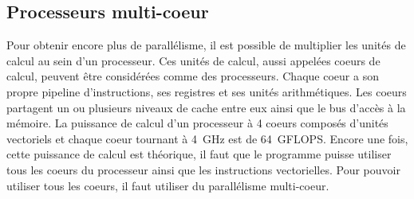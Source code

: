 \subsection{Processeurs multi-coeur}
Pour obtenir encore plus de parallélisme, il est possible de multiplier les unités de calcul au sein d'un processeur.
%
Ces unités de calcul, aussi appelées coeurs de calcul, peuvent être considérées comme des processeurs.
%
Chaque coeur a son propre pipeline d'instructions, ses registres et ses unités arithmétiques.
%
Les coeurs partagent un ou plusieurs niveaux de cache entre eux ainsi que le bus d'accès à la mémoire.
%
La puissance de calcul d'un processeur à 4 coeurs composés d'unités vectoriels et chaque coeur tournant à 4~GHz est de 64~GFLOPS.
%
Encore une fois, cette puissance de calcul est théorique, il faut que le programme puisse utiliser tous les coeurs du processeur ainsi que les instructions vectorielles.
%
Pour pouvoir utiliser tous les coeurs, il faut utiliser du parallélisme multi-coeur.
